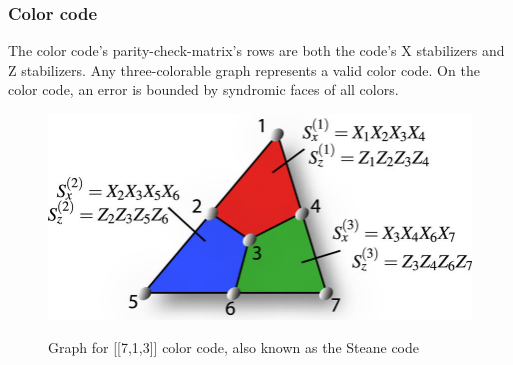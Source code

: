 \subsubsection{Color code}
The color code's parity-check-matrix's 
rows are both the code's X stabilizers and Z stabilizers.
Any three-colorable graph represents a valid color code.
On the color code, an error is bounded by syndromic faces of all colors.
\\
\begin{figure}[h!]
	\begin{center}
	\captionsetup{justification=centering,margin=2cm}
	\includegraphics[scale=0.7]{./img/figures/steane_code.png}\\
	\caption{Graph for [[7,1,3]] color code, also known as the
    Steane code}
        
	\label{fig: color_graph}
	\end{center}
\end{figure}
